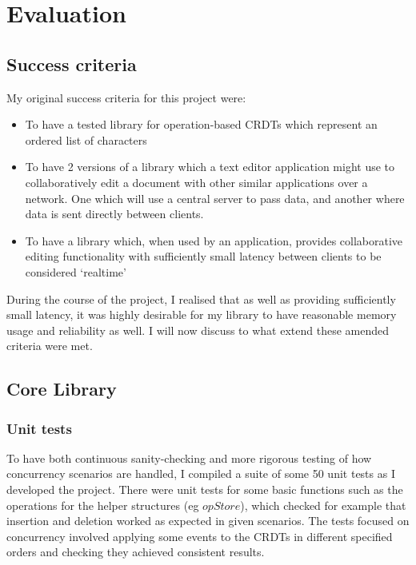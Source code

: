 \documentclass[diss.tex]{subfiles}
\begin{document}
\chapter{Evaluation}
\label{chap:evaluation}
\section{Success criteria}
My original success criteria for this project were:
\begin{itemize}
	\item To have a tested library for operation-based CRDTs which represent an ordered list of characters
	\item To have 2 versions of a library which a text editor application might use to collaboratively edit a document with other similar applications over a network. One which will use a central server to pass data, and another where data is sent directly between clients.
	\item To have a library which, when used by an application, provides collaborative editing functionality with sufficiently small latency between clients to be considered `realtime'
\end{itemize}

During the course of the project, I realised that as well as providing sufficiently small latency, it was highly desirable for my library to have reasonable memory usage and reliability as well. I will now discuss to what extend these amended criteria were met.
\section{Core Library}
\subsection{Unit tests}
To have both continuous sanity-checking and more rigorous testing of how concurrency scenarios are handled, I compiled a suite of some 50 unit tests as I developed the project. There were unit tests for some basic functions such as the operations for the helper structures (eg $opStore$), which checked for example that insertion and deletion worked as expected in given scenarios. The tests focused on concurrency involved applying some events to the CRDTs in different specified orders and checking they achieved consistent results.
\end{document}
